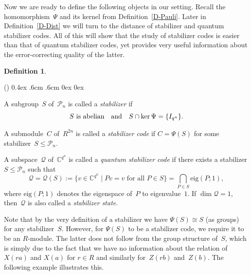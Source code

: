 \documentclass[11pt]{article}
\theoremstyle{definition}
\newtheorem{defi}[theo]{Definition}
\numberwithin{equation}{section}
\newcommand{\C}{{\mathbb C}}
\newcommand{\cP}{{\mathcal P}}
\newcommand{\cQ}{{\mathcal Q}}
\newcounter{ara}
\newcounter{rom}
\newenvironment{arabiclist}{\begin{list}{(\arabic{ara})\hfill}{\usecounter{ara}
     \topsep0.4ex \labelwidth.6cm \leftmargin.6cm \labelsep0cm
     \rightmargin0cm \parsep0ex \itemsep0ex}}{\end{list}}
\begin{document}
Now we are ready to define the following objects in our setting.
Recall the homomorphism~$\Psi$ and its kernel from Definition~\ref{D-Pauli}.
Later in Definition~\ref{D-Dist} we will turn to the distance of stabilizer and quantum stabilizer codes.
All of this will show that the study of stabilizer codes is easier than that of quantum stabilizer codes, yet provides
very useful information about the error-correcting quality of the latter.

\begin{defi}\label{D-Stab}
\begin{arabiclist}
\item A subgroup~$S$ of~$\cP_n$  is called a \emph{stabilizer} if
      \[
         S\text{ is abelian\quad and\quad}S\cap\ker\Psi=\{I_{q^n}\}.
      \]
\item A submodule~$C$ of~$R^{2n}$ is called a \emph{stabilizer code} if $C=\Psi(S)$ for some stabilizer~$S\leq\cP_n$.
\item A subspace~$\cQ$ of~$\C^{q^n}$ is called a \emph{quantum stabilizer code} if there exists a stabilizer $S\leq\cP_n$ such that
      \[
         \cQ=\cQ(S):=\{v\in\C^{q^n}\mid Pv=v\text{ for all }P\in S\}=\bigcap_{P\in S}\text{eig}(P;1),
      \]
      where $\text{eig}(P;1)$ denotes the eigenspace of~$P$ to eigenvalue~$1$.
      If $\dim\cQ=1$, then~$\cQ$ is also called a \emph{stabilizer state}.
\end{arabiclist}
\end{defi}

Note that by the very definition of a stabilizer we have $\Psi(S)\cong S$ (as groups) for any stabilizer~$S$.
However, for $\Psi(S)$ to be a stabilizer code, we require it to be an $R$-module.
The latter does not follow from the group structure of~$S$, which is simply due to the fact that we have no
information about the relation of $X(ra)$ and $X(a)$ for $r\in R$ and similarly for~$Z(rb)$ and~$Z(b)$.
The following example illustrates this.
\end{document}
